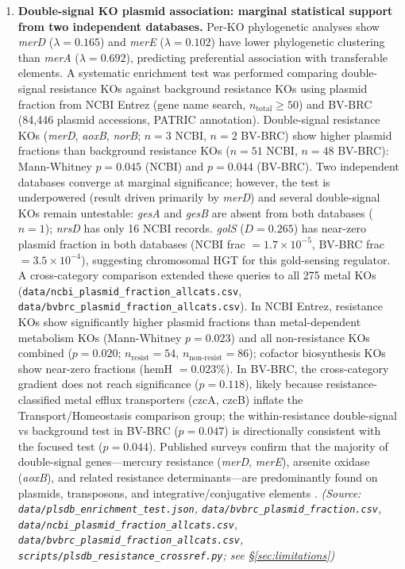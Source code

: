 \documentclass[times]{zHenriquesLab-StyleBioRxiv}
\begin{document}
\begin{enumerate}
\item \textbf{Double-signal KO plasmid association: marginal statistical support from two independent databases.}
Per-KO phylogenetic analyses show \textit{merD} ($\lambda = 0.165$) and \textit{merE} ($\lambda = 0.102$)
have lower phylogenetic clustering than \textit{merA} ($\lambda = 0.692$), predicting
preferential association with transferable elements.
A systematic enrichment test was performed comparing double-signal resistance KOs against
background resistance KOs using plasmid fraction from NCBI Entrez (gene name search,
$n_\text{total} \geq 50$) and BV-BRC (84{,}446 plasmid accessions, PATRIC annotation).
Double-signal resistance KOs (\textit{merD}, \textit{aoxB}, \textit{norB}; $n=3$ NCBI,
$n=2$ BV-BRC) show higher plasmid fractions than background resistance KOs ($n=51$ NCBI,
$n=48$ BV-BRC): Mann-Whitney $p=0.045$ (NCBI) and $p=0.044$ (BV-BRC).
Two independent databases converge at marginal significance; however, the test is
underpowered (result driven primarily by \textit{merD}) and several double-signal KOs
remain untestable: \textit{gesA} and \textit{gesB} are absent from both databases ($n=1$);
\textit{nrsD} has only 16 NCBI records. \textit{golS} ($D=0.265$) has near-zero plasmid
fraction in both databases (NCBI frac $= 1.7\times 10^{-5}$, BV-BRC frac $= 3.5\times 10^{-4}$),
suggesting chromosomal HGT for this gold-sensing regulator.
A cross-category comparison extended these queries to all 275 metal KOs
(\texttt{data/ncbi\_plasmid\_fraction\_allcats.csv}, \texttt{data/bvbrc\_plasmid\_fraction\_allcats.csv}).
In NCBI Entrez, resistance KOs show significantly higher plasmid fractions than
metal-dependent metabolism KOs (Mann-Whitney $p=0.023$) and all non-resistance KOs
combined ($p=0.020$; $n_\text{resist}=54$, $n_\text{non-resist}=86$); cofactor
biosynthesis KOs show near-zero fractions (hemH $= 0.023\%$). In BV-BRC, the
cross-category gradient does not reach significance ($p=0.118$), likely because
resistance-classified metal efflux transporters (czcA, czcB) inflate the
Transport/Homeostasis comparison group; the within-resistance double-signal vs
background test in BV-BRC ($p=0.047$) is directionally consistent with the focused
test ($p=0.044$). Published surveys confirm that the majority of double-signal genes---mercury
resistance (\textit{merD}, \textit{merE}), arsenite oxidase (\textit{aoxB}), and
related resistance determinants---are predominantly found on plasmids, transposons,
and integrative/conjugative elements
\cite{silver1998,liebert1999,coombs2004,goff2024,silver2005}.
\textit{(Source: \texttt{data/plsdb\_enrichment\_test.json}, \texttt{data/bvbrc\_plasmid\_fraction.csv},
\texttt{data/ncbi\_plasmid\_fraction\_allcats.csv}, \texttt{data/bvbrc\_plasmid\_fraction\_allcats.csv},
\texttt{scripts/plsdb\_resistance\_crossref.py}; see \S\ref{sec:limitations})}


\end{enumerate}
\end{document}

